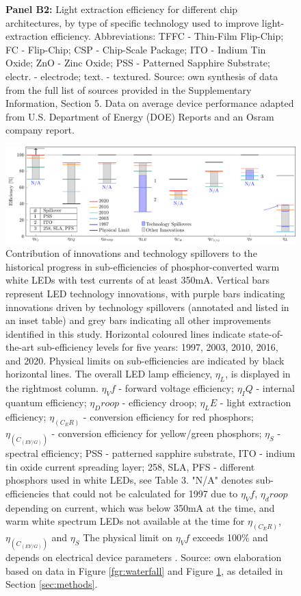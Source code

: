 \documentclass[twoside,twocolumn,9pt]{article}
\begin{document}
\begin{figure}[h!]
{ \textbf{Panel B2:} Light extraction efficiency for different chip architectures, by type of specific technology used to improve light-extraction efficiency. Abbreviations: TFFC - Thin-Film Flip-Chip; FC - Flip-Chip; CSP - Chip-Scale Package; ITO - Indium Tin Oxide; ZnO - Zinc Oxide; PSS - Patterned Sapphire Substrate; electr. - electrode; text. - textured.
 Source: own synthesis of data from the full list of sources provided in the Supplementary Information, Section 5. Data on average device performance adapted from U.S. Department of Energy (DOE) Reports\cite{doe_ssl_multiyear_2007}\cite{doe_ssl_multiyear_2008}\cite{doe_ssl_multiyear_2013}\cite{doe_ssl_rnd_2016}\cite{doe_ssl_rnd_2018} and an Osram company report\cite{beale_leds_2015}.}
 \label{fgr:subeff}
\end{figure}

\begin{figure}[h!]
 \centering
 \includegraphics[width=\textwidth]{2_SSL_EES/article/figures/breakthroughs_efficiency.pdf}
 \caption{Contribution of innovations and technology spillovers to the historical progress in sub-efficiencies of phosphor-converted warm white LEDs with test currents of at least 350mA. Vertical bars represent LED technology innovations, with purple bars indicating innovations driven by technology spillovers (annotated and listed in an inset table) and grey bars indicating all other improvements identified in this study. Horizontal coloured lines indicate state-of-the-art sub-efficiency levels for five years: 1997, 2003, 2010, 2016, and 2020. Physical limits on sub-efficiencies are indicated by black horizontal lines. The overall LED lamp efficiency, $\eta_L$, is displayed in the rightmost column. $\eta_Vf$ - forward voltage efficiency; $\eta_IQ$ - internal quantum efficiency; $\eta_Droop$ - efficiency droop; $\eta_LE$ - light extraction efficiency; $\eta_(C_ER)$ - conversion efficiency for red phosphors; $\eta_(C_(EY/G))$ - conversion efficiency for yellow/green phosphors; $\eta_S$ - spectral efficiency; PSS - patterned sapphire substrate, ITO - indium tin oxide current spreading layer; 258, SLA, PFS - different phosphors used in white LEDs, see Table 3. "N/A" denotes sub-efficiencies that could not be calculated for 1997 due to $\eta_Vf$, $\eta_droop$ depending on current, which was below 350mA at the time, and warm white spectrum LEDs not available at the time for $\eta_(C_ER)$,$\eta_(C_(EY/G))$  and $\eta_S$ The physical limit on $\eta_Vf$ exceeds 100\% and depends on electrical device parameters \cite{david2016electrical}. Source: own elaboration based on data in Figure \ref{fgr:waterfall} and Figure \ref{fgr:subeff}, as detailed in Section \ref{sec:methods}.}
 \label{fgr:breakthroughs_efficiency}
\end{figure}
\end{document}
